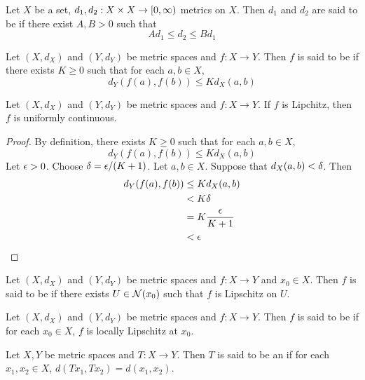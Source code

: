 \documentclass{book}
\begin{document}
\begin{defn} \ld{}
	Let $X$ be a set, $d_1, d_2: X \times X \rightarrow [0,\infty)$ metrics on $X$. Then $d_1$ and $d_2$ are said to be  if there exist $A, B > 0$ such that $$A d_1 \leq d_2 \leq B d_1$$		
\end{defn}	

\begin{defn} \ld{}
	Let $(X, d_X)$ and $(Y, d_Y)$ be metric spaces and $f: X \rightarrow Y$. Then $f$ is said to be  if there exists $K \geq 0$ such that for each $a, b \in X$, $$d_Y(f(a), f(b)) \leq Kd_X(a,b)$$
\end{defn}	

\begin{ex} \lex{}
	Let $(X, d_X)$ and $(Y, d_Y)$ be metric spaces and $f: X \rightarrow Y$. If $f$ is Lipchitz, then $f$ is uniformly continuous.	
\end{ex}

\begin{proof}
	By definition, there exists $K \geq 0$ such that for each $a, b \in X$, $$d_Y(f(a), f(b)) \leq Kd_X(a,b)$$ Let $\epsilon >0$. Choose $\delta = \epsilon / (K+1)$. Let $a, b \in X$. Suppose that $d_X(a,b) < \delta$. Then 
	\begin{align*}
		d_Y(f(a), f(b)) 
		& \leq Kd_X(a,b) \\
		& < K \delta \\
		&= K \frac{\epsilon}{K+1} \\
		&< \epsilon  
	\end{align*}
\end{proof}

\begin{defn} \ld{}
	Let $(X, d_X)$ and $(Y, d_Y)$ be metric spaces and $f: X \rightarrow Y$ and $x_0 \in X$. Then $f$ is said to be  if there exists $U \in \mathcal{N}(x_0)$ such that $f$ is Lipschitz on $U$.
\end{defn}

\begin{defn} \ld{}
	Let $(X, d_X)$ and $(Y, d_Y)$ be metric spaces and $f: X \rightarrow Y$. Then $f$ is said to be  if for each $x_0 \in X$, $f$ is locally Lipschitz at $x_0$.
\end{defn}


\begin{defn} \ld{}
	Let $X, Y$ be metric spaces and $T : X \rightarrow Y$. Then $T$ is said to be an  if for each $x_1, x_2 \in X$, $d( Tx_1, Tx_2) = d(x_1,x_2) $.
\end{defn}
\end{document}
